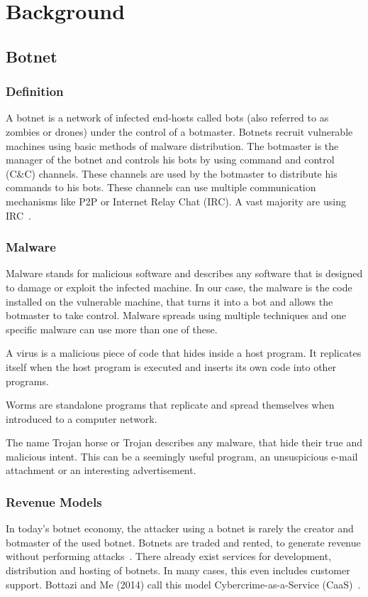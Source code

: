 \section{Background}
\subsection{Botnet}
\subsubsection{Definition}
A botnet is a network of infected end-hosts called bots (also referred to as zombies or drones) under the control of a botmaster.
Botnets recruit vulnerable machines using basic methods of malware distribution.
The botmaster is the manager of the botnet and controls his bots by using command and control (C\&C) channels.
These channels are used by the botmaster to distribute his commands to his bots.
These channels can use multiple communication mechanisms like P2P or Internet Relay Chat (IRC).
A vast majority are using IRC~\cite{AbuRajab06}.

\subsubsection{Malware}
Malware stands for malicious software and describes any software that is designed to damage or exploit the infected machine.
In our case, the malware is the code installed on the vulnerable machine, that turns it into a bot and allows the botmaster to take control.
Malware spreads using multiple techniques and one specific malware can use more than one of these.

A virus is a malicious piece of code that hides inside a host program.
It replicates itself when the host program is executed and inserts its own code into other programs.

Worms are standalone programs that replicate and spread themselves when introduced to a computer network.

The name Trojan horse or Trojan describes any malware, that hide their true and malicious intent.
This can be a seemingly useful program, an unsuspicious e-mail attachment or an interesting advertisement.


\subsubsection{Revenue Models}
In today's botnet economy, the attacker using a botnet is rarely the creator and botmaster of the used botnet.
Botnets are traded and rented, to generate revenue without performing attacks~\cite{Li09}.
There already exist services for development, distribution and hosting of botnets.
In many cases, this even includes customer support.
Bottazi and Me (2014) call this model Cybercrime-as-a-Service (CaaS)~\cite{Bottazzi14}.

